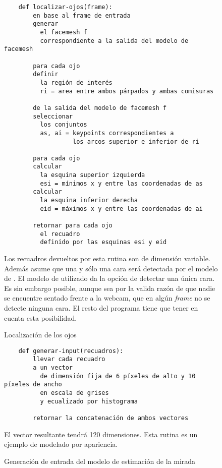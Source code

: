   \begin{figure}
    \centering
    \begin{verbatim}
    def localizar-ojos(frame):
        en base al frame de entrada
        generar
          el facemesh f
          correspondiente a la salida del modelo de facemesh

        para cada ojo
        definir
          la región de interés
          ri = area entre ambos párpados y ambas comisuras
        
        de la salida del modelo de facemesh f
        seleccionar
          los conjuntos
          as, ai = keypoints correspondientes a
                   los arcos superior e inferior de ri
        
        para cada ojo
        calcular
          la esquina superior izquierda
          esi = mínimos x y entre las coordenadas de as
        calcular
          la esquina inferior derecha
          eid = máximos x y entre las coordenadas de ai
      
        retornar para cada ojo
          el recuadro
          definido por las esquinas esi y eid
    \end{verbatim}
    Los recuadros devueltos por esta rutina son de dimensión variable. \\
    Además asume que una y sólo una cara será detectada por el modelo de
    \facemesh.
    El modelo de \tfjs utilizado da la opción de detectar una única cara.
    Es sin embargo posible, aunque sea por la valida razón de que nadie se
    encuentre sentado frente a la webcam, que en algún \textit{frame} no se
    detecte ninguna cara.
    El resto del programa tiene que tener en cuenta esta posibilidad.
    \caption{Localización de los ojos}
    \label{fig:eyes-localization}
  \end{figure}

  \begin{figure}
    \begin{verbatim}
    def generar-input(recuadros):
        llevar cada recuadro
        a un vector
          de dimensión fija de 6 píxeles de alto y 10 píxeles de ancho
          en escala de grises
          y ecualizado por histograma

        retornar la concatenación de ambos vectores
    \end{verbatim}
    El vector resultante tendrá 120 dimensiones.
    Esta rutina es un ejemplo de modelado por apariencia.
    \caption{Generación de entrada del modelo de estimación de la mirada}
    \label{fig:eye-features-to-model-input}
  \end{figure}


